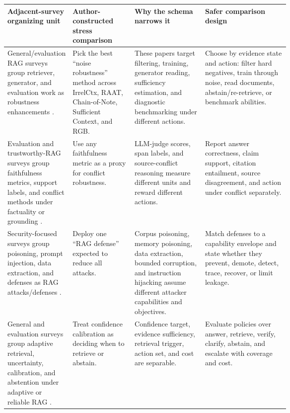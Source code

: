 \begin{table}[t]
\centering
\scriptsize
\renewcommand{\arraystretch}{0.88}
\begin{tabularx}{\linewidth}{>{\raggedright\arraybackslash}p{0.19\linewidth}>{\raggedright\arraybackslash}p{0.22\linewidth}>{\raggedright\arraybackslash}p{0.25\linewidth}X}
\toprule
\textbf{Adjacent-survey organizing unit} & \textbf{Author-constructed stress comparison} & \textbf{Why the schema narrows it} & \textbf{Safer comparison design} \\
\midrule
General/evaluation RAG surveys group retriever, generator, and evaluation work as robustness enhancements \citep{ragSurvey2024,ragComprehensive2025,ragEvaluationSurvey2024}. & Pick the best ``noise robustness'' method across IrrelCtx, RAAT, Chain-of-Note, Sufficient Context, and RGB. & These papers target filtering, training, generator reading, sufficiency estimation, and diagnostic benchmarking under different actions. & Choose by evidence state and action: filter hard negatives, train through noise, read documents, abstain/re-retrieve, or benchmark abilities. \\
Evaluation and trustworthy-RAG surveys group faithfulness metrics, support labels, and conflict methods under factuality or grounding \citep{ragEvaluationSurvey2024,trustRAGCompass2024,trustworthyRAGSurvey2025}. & Use any faithfulness metric as a proxy for conflict robustness. & LLM-judge scores, span labels, and source-conflict reasoning measure different units and reward different actions. & Report answer correctness, claim support, citation entailment, source disagreement, and action under conflict separately. \\
Security-focused surveys group poisoning, prompt injection, data extraction, and defenses as RAG attacks/defenses \citep{securityRAGSurvey2026,trustworthyRAGSurvey2025}. & Deploy one ``RAG defense'' expected to reduce all attacks. & Corpus poisoning, memory poisoning, data extraction, bounded corruption, and instruction hijacking assume different attacker capabilities and objectives. & Match defenses to a capability envelope and state whether they prevent, demote, detect, trace, recover, or limit leakage. \\
General and evaluation surveys group adaptive retrieval, uncertainty, calibration, and abstention under adaptive or reliable RAG \citep{ragComprehensive2025,ragEvaluationSurvey2024}. & Treat confidence calibration as deciding when to retrieve or abstain. & Confidence target, evidence sufficiency, retrieval trigger, action set, and cost are separable. & Evaluate policies over answer, retrieve, verify, clarify, abstain, and escalate with coverage and cost. \\

\end{tabularx}
\end{table}
